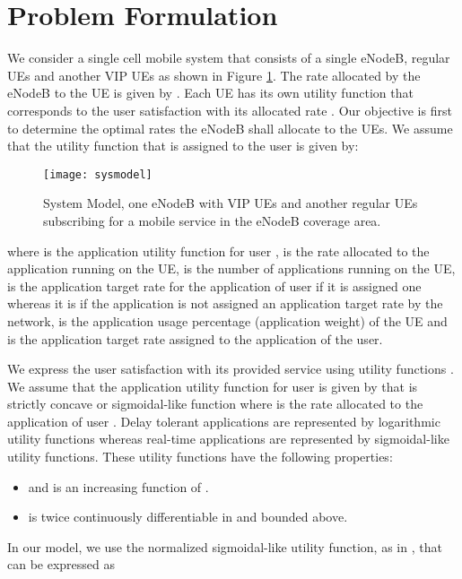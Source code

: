 \documentclass[journal]{IEEEtran} 				\IEEEoverridecommandlockouts 						\usepackage{amsmath,amssymb}
\begin{document}
\section{Problem Formulation}\label{sec:Problem_formulation}
We consider a single cell mobile system that consists of a single eNodeB,  regular UEs and another  VIP UEs as shown in Figure \ref{fig:system_model1}. The rate allocated by the eNodeB to the  UE is given by . Each UE has its own utility function  that corresponds to the user satisfaction with its allocated rate . Our objective is first to determine the optimal rates the eNodeB shall allocate to the UEs. We assume that the utility function  that is assigned to the  user is given by:
\begin{figure}
\texttt{[image: sysmodel]}
 \caption{System Model, one eNodeB with  VIP UEs and another  regular UEs subscribing for a mobile service in the eNodeB coverage area.}
 \label{fig:system_model1}
 \end{figure}



where  is the  application utility function for user ,  is the rate allocated to the  application running on the  UE,  is the number of applications running on the  UE,  is the application target rate for the  application of user  if it is assigned one whereas it is  if the  application is not assigned an application target rate by the network,  is the  application usage percentage (application weight) of the  UE and  is the application target rate assigned to the  application of the  user. 

We express the user satisfaction with its provided service using utility functions \cite{DL_PowerAllocation} \cite{Fundamental} \cite{Utility-proportional}. We assume that the  application utility function for user  is given by  that is strictly concave or sigmoidal-like function where  is the rate allocated to the  application of user . Delay tolerant applications are represented by logarithmic utility functions whereas real-time applications are represented by sigmoidal-like utility functions. These utility functions have the following properties:
\begin{itemize}
\item  and  is an increasing function of .
\item  is twice continuously differentiable in  and bounded above.
\end{itemize}
In our model, we use the normalized sigmoidal-like utility function, as in \cite{DL_PowerAllocation}, that can be expressed as
\end{document}
